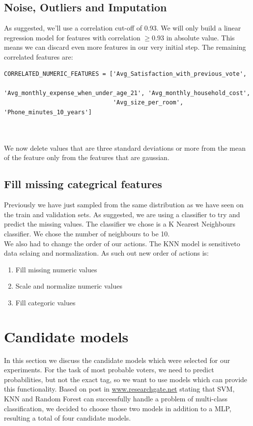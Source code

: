 \documentclass[12pt]{article}
\begin{document}
\subsection{Noise, Outliers and Imputation}
As suggested, we'll use a correlation cut-off of 0.93. We will only build a linear regression model for features with correlation $\geq 0.93$ in absolute value. This means we can discard even more features in our very initial step. The remaining correlated features are:\\

\begin{adjustbox}{max width=\linewidth}
\begin{lstlisting}
CORRELATED_NUMERIC_FEATURES = ['Avg_Satisfaction_with_previous_vote',
                               'Avg_monthly_expense_when_under_age_21', 'Avg_monthly_household_cost',
                               'Avg_size_per_room', 'Phone_minutes_10_years']
\end{lstlisting}
\end{adjustbox}\\
\\

We now delete values that are three standard deviations or more from the mean of the feature only from the features that are gaussian.

\subsection{Fill missing categrical features}
Previously we have just sampled from the same distribution as we have seen on the train and validation sets. As suggested, we are using a classifier to try and predict the missing values. The classifier we chose is a K Nearest Neighbours classifier. We chose the number of neighbours to be 10.\\
We also had to change the order of our actions. The KNN model is sensitiveto data sclaing and normalization. As such out new order of actions is:
\begin{enumerate}
\item Fill missing numeric values
\item Scale and normalize numeric values
\item Fill categoric values
\end{enumerate}

\section{Candidate models}
In this section we discuss the candidate models which were selected for our experiments. For the task of most probable voters, we need to predict probabilities, but not the exact tag, so we want to use models which can provide this functionality. Based on post in \href{https://www.researchgate.net/post/What_are_the_best_supervised_classifiers_to_classify_the_problem_of_multiclass_classification}{www.researchgate.net} stating that SVM, KNN and Random Forest can successfully handle a problem of multi-class classification, we decided to choose those two models in addition to a MLP, resulting a total of four candidate models.
\end{document}
